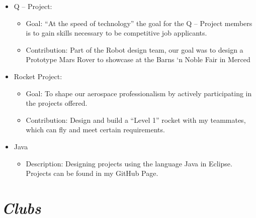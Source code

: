 \documentclass[11pt]{article}
\begin{document}
\begin{itemize}


\item Q – Project: 

    \begin{itemize}
     \item  Goal: “At the speed of technology” the goal for the Q – Project members is to gain skills necessary to be competitive job applicants.
     \end{itemize}
     
     \begin{itemize}
     \item  Contribution: Part of the Robot design team, our goal was to design a Prototype Mars Rover to showcase at the Barns ‘n Noble Fair in Merced
     \end{itemize} 
   
     
     
     
\item Rocket Project: 

     \begin{itemize}
     \item  Goal: To shape our aerospace professionalism by actively participating in the projects offered.
     \end{itemize} 
     
     \begin{itemize}
     \item Contribution: Design and build a “Level 1” rocket with my teammates, which can fly and meet certain requirements. 
     \end{itemize} 
     
     
     
\item Java 

     \begin{itemize}
     \item  Description: Designing projects using the language Java in Eclipse. Projects can be found in my GitHub Page. 
     \end{itemize} 
     
     \end{itemize} 



\section{\textit {Clubs}}
\end{document}
